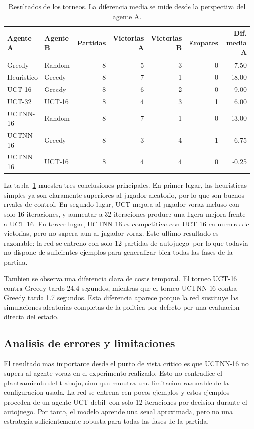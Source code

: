 \documentclass[conference,a4paper]{IEEEtran}
\begin{document}
\begin{table}[t]
\centering
\caption{Resultados de los torneos. La diferencia media se mide desde la perspectiva del agente A.}
\label{tab:torneos}
\begin{tabular}{llrrrrr}
\toprule
Agente A & Agente B & Partidas & Victorias A & Victorias B & Empates & Dif. media A \\
\midrule
Greedy & Random & 8 & 5 & 3 & 0 & 7.50 \\
Heuristico & Greedy & 8 & 7 & 1 & 0 & 18.00 \\
UCT-16 & Greedy & 8 & 6 & 2 & 0 & 9.00 \\
UCT-32 & UCT-16 & 8 & 4 & 3 & 1 & 6.00 \\
UCTNN-16 & Random & 8 & 7 & 1 & 0 & 13.00 \\
UCTNN-16 & Greedy & 8 & 3 & 4 & 1 & -6.75 \\
UCTNN-16 & UCT-16 & 8 & 4 & 4 & 0 & -0.25 \\
\bottomrule
\end{tabular}
\end{table}

La tabla~\ref{tab:torneos} muestra tres conclusiones principales. En primer
lugar, las heuristicas simples ya son claramente superiores al jugador aleatorio,
por lo que son buenos rivales de control. En segundo lugar, UCT mejora al jugador
voraz incluso con solo 16 iteraciones, y aumentar a 32 iteraciones produce una
ligera mejora frente a UCT-16. En tercer lugar, UCTNN-16 es competitivo con
UCT-16 en numero de victorias, pero no supera aun al jugador voraz. Este ultimo
resultado es razonable: la red se entreno con solo 12 partidas de autojuego, por
lo que todavia no dispone de suficientes ejemplos para generalizar bien todas las
fases de la partida.

Tambien se observa una diferencia clara de coste temporal. El torneo UCT-16
contra Greedy tardo 24.4 segundos, mientras que el torneo UCTNN-16 contra Greedy
tardo 1.7 segundos. Esta diferencia aparece porque la red sustituye las
simulaciones aleatorias completas de la politica por defecto por una evaluacion
directa del estado.

\subsection{Analisis de errores y limitaciones}

El resultado mas importante desde el punto de vista critico es que UCTNN-16 no
supera al agente voraz en el experimento realizado. Esto no contradice el
planteamiento del trabajo, sino que muestra una limitacion razonable de la
configuracion usada. La red se entrena con pocos ejemplos y estos ejemplos
proceden de un agente UCT debil, con solo 12 iteraciones por decision durante el
autojuego. Por tanto, el modelo aprende una senal aproximada, pero no una
estrategia suficientemente robusta para todas las fases de la partida.
\end{document}
